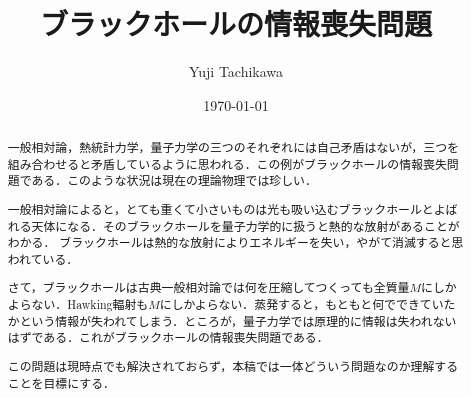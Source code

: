 \documentclass[english, dvipdfmx, a4paper]{jsarticle}
\title{ブラックホールの情報喪失問題}
\author{Yuji Tachikawa}
\date{\today}
\theoremstyle{break}
\begin{document}
	\maketitle
	\begin{abstract}
			一般相対論，熱統計力学，量子力学の三つのそれぞれには自己矛盾はないが，三つを組み合わせると矛盾しているように思われる．この例がブラックホールの情報喪失問題である．このような状況は現在の理論物理では珍しい．

			一般相対論によると，とても重くて小さいものは光も吸い込むブラックホールとよばれる天体になる\cite{Schwarzschild:1916uq}．そのブラックホールを量子力学的に扱うと熱的な放射があることがわかる\cite{Hawking:1974rv}．
			ブラックホールは熱的な放射によりエネルギーを失い，やがて消滅すると思われている．

			さて，ブラックホールは古典一般相対論では何を圧縮してつくっても全質量$M $にしかよらない．Hawking輻射も$M $にしかよらない．蒸発すると，もともと何でできていたかという情報が失われてしまう．ところが，量子力学では原理的に情報は失われないはずである．これがブラックホールの情報喪失問題である．

			この問題は現時点でも解決されておらず，本稿では一体どういう問題なのか理解することを目標にする．
	\end{abstract}
	\tableofcontents
	
	
	
	
\end{document}
